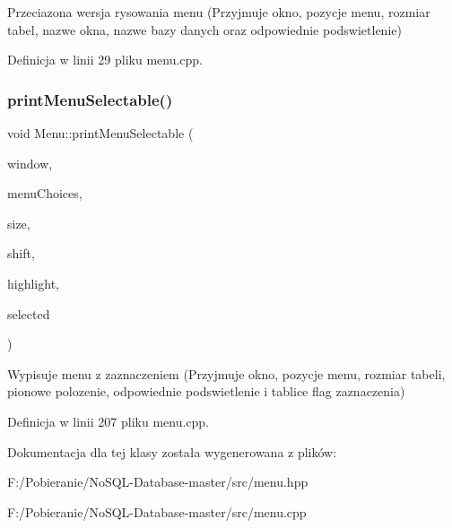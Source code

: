 Przeciazona wersja rysowania menu (Przyjmuje okno, pozycje menu, rozmiar tabel, nazwe okna, nazwe bazy danych oraz odpowiednie podswietlenie) 

Definicja w linii 29 pliku menu.\+cpp.

\mbox{\label{class_menu_afcf3606c830a65335e61b1d0bd4e432a}} 
\subsubsection{\texorpdfstring{print\+Menu\+Selectable()}{printMenuSelectable()}}
{\footnotesize\ttfamily void Menu\+::print\+Menu\+Selectable (\begin{DoxyParamCaption}\item[{W\+I\+N\+D\+OW $\ast$}]{window,  }\item[{const std\+::string $\ast$}]{menu\+Choices,  }\item[{unsigned int}]{size,  }\item[{unsigned int}]{shift,  }\item[{unsigned int}]{highlight,  }\item[{bool $\ast$}]{selected }\end{DoxyParamCaption})\hspace{0.3cm}{\ttfamily [static]}}

Wypisuje menu z zaznaczeniem (Przyjmuje okno, pozycje menu, rozmiar tabeli, pionowe polozenie, odpowiednie podswietlenie i tablice flag zaznaczenia) 

Definicja w linii 207 pliku menu.\+cpp.



Dokumentacja dla tej klasy została wygenerowana z plików\+:\begin{DoxyCompactItemize}
\item 
F\+:/\+Pobieranie/\+No\+S\+Q\+L-\/\+Database-\/master/src/menu.\+hpp\item 
F\+:/\+Pobieranie/\+No\+S\+Q\+L-\/\+Database-\/master/src/menu.\+cpp\end{DoxyCompactItemize}
